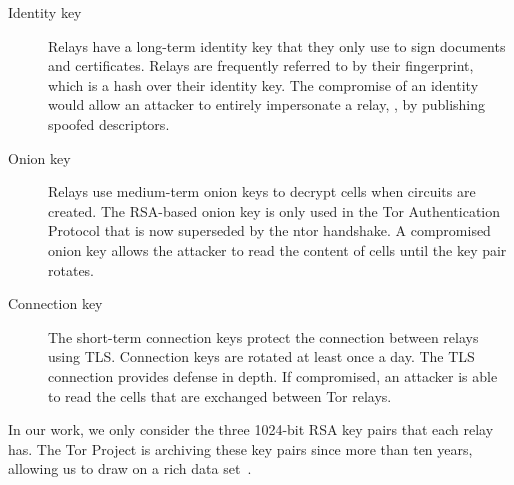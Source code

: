 \begin{description}
    \item[Identity key]  Relays have a long-term identity key that they only use
        to sign documents and certificates.  Relays are frequently referred to
        by their fingerprint, which is a hash over their identity key.  The
        compromise of an identity would allow an attacker to entirely
        impersonate a relay, \eg, by publishing spoofed descriptors.
    \item[Onion key]  Relays use medium-term onion keys to decrypt cells when
        circuits are created.  The RSA-based onion key is only used in the Tor
        Authentication Protocol that is now superseded by the ntor handshake.  A
        compromised onion key allows the attacker to read the content of cells
        until the key pair rotates.
    \item[Connection key] The short-term connection keys protect the connection
        between relays using TLS.  Connection keys are rotated at least once a
        day.  The TLS connection provides defense in depth.  If compromised, an
        attacker is able to read the cells that are exchanged between Tor
        relays.
\end{description}

In our work, we only consider the three 1024-bit RSA key pairs that each relay
has.  The Tor Project is archiving these key pairs since more than ten years,
allowing us to draw on a rich data set~\cite{collector}.
